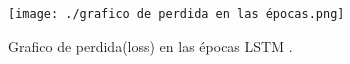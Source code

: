 \begin{figure}[H]
  \begin{center}
    \texttt{[image: ./grafico de perdida en las épocas.png]}
    \caption{Grafico de perdida(loss) en las épocas LSTM .}
    \label{fig:perdida}
  \end{center}
\end{figure}


















